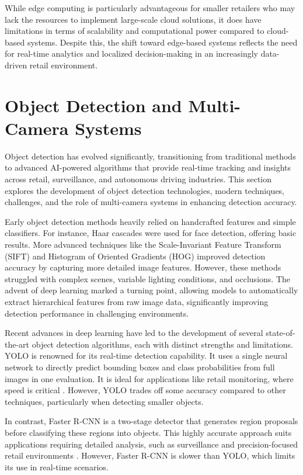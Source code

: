 {While edge computing is particularly advantageous for smaller retailers who may lack the resources to implement large-scale cloud solutions, it does have limitations in terms of scalability and computational power compared to cloud-based systems. Despite this, the shift toward edge-based systems reflects the need for real-time analytics and localized decision-making in an increasingly data-driven retail environment.

\section{Object Detection and Multi-Camera Systems}
Object detection has evolved significantly, transitioning from traditional methods to advanced AI-powered algorithms that provide real-time tracking and insights across retail, surveillance, and autonomous driving industries. This section explores the development of object detection technologies, modern techniques, challenges, and the role of multi-camera systems in enhancing detection accuracy.

Early object detection methods heavily relied on handcrafted features and simple classifiers. For instance, Haar cascades were used for face detection, offering basic results. More advanced techniques like the Scale-Invariant Feature Transform (SIFT) and Histogram of Oriented Gradients (HOG) improved detection accuracy by capturing more detailed image features. However, these methods struggled with complex scenes, variable lighting conditions, and occlusions. The advent of deep learning marked a turning point, allowing models to automatically extract hierarchical features from raw image data, significantly improving detection performance in challenging environments.

Recent advances in deep learning have led to the development of several state-of-the-art object detection algorithms, each with distinct strengths and limitations. YOLO is renowned for its real-time detection capability. It uses a single neural network to directly predict bounding boxes and class probabilities from full images in one evaluation. It is ideal for applications like retail monitoring, where speed is critical \citep{Erlina2023}. However, YOLO trades off some accuracy compared to other techniques, particularly when detecting smaller objects.

In contrast, Faster R-CNN is a two-stage detector that generates region proposals before classifying these regions into objects. This highly accurate approach suits applications requiring detailed analysis, such as surveillance and precision-focused retail environments \citep{Chen2022}. However, Faster R-CNN is slower than YOLO, which limits its use in real-time scenarios.

}
